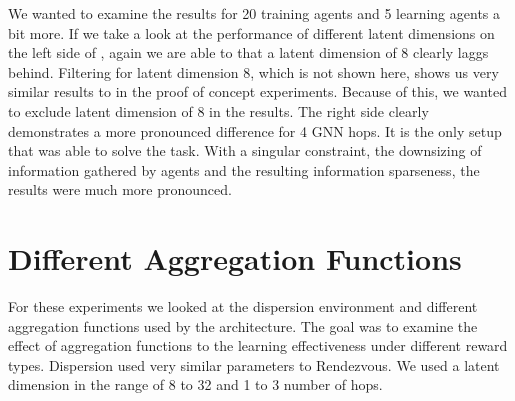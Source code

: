 We wanted to examine the results for 20 training agents and 5 learning agents a bit more. If we take a look at the performance of different latent dimensions on the left side of , again we are able to that a latent dimension of 8 clearly laggs behind. Filtering for latent dimension 8, which is not shown here, shows us very similar results to  in the proof of concept experiments. Because of this, we wanted to exclude latent dimension of 8 in the results. The right side clearly demonstrates a more pronounced difference for 4 GNN hops. It is the only setup that was able to solve the task. With a singular constraint, the downsizing of information gathered by agents and the resulting information sparseness, the results were much more pronounced.



\section{Different Aggregation Functions}
\label{sec:Different Aggregation Functions}
For these experiments we looked at the dispersion environment and different aggregation functions used by the architecture. The goal was to examine the effect of aggregation functions to the learning effectiveness under different reward types. Dispersion used very similar parameters to Rendezvous. We used a latent dimension in the range of 8 to 32 and 1 to 3 number of hops.


